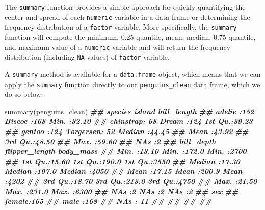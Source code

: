 \documentclass[
]{book}
\newenvironment{Shaded}{\begin{snugshade}}{\end{snugshade}}
\newcommand{\DocumentationTok}[1]{\textcolor[rgb]{0.56,0.35,0.01}{\textbf{\textit{#1}}}}
\newcommand{\FunctionTok}[1]{\textcolor[rgb]{0.00,0.00,0.00}{#1}}
\newcommand{\NormalTok}[1]{#1}
\theoremstyle{definition}
\theoremstyle{definition}
\theoremstyle{definition}
\theoremstyle{definition}
\theoremstyle{remark}
\begin{document}
The \texttt{summary} function provides a simple approach for quickly quantifying the center and spread of each \texttt{numeric} variable in a data frame or determining the frequency distribution of a \texttt{factor} variable. More specifically, the \texttt{summary} function will compute the minimum, 0.25 quantile, mean, median, 0.75 quantile, and maximum value of a \texttt{numeric} variable and will return the frequency distribution (including \texttt{NA} values) of \texttt{factor} variable.

A \texttt{summary} method is available for a \texttt{data.frame} object, which means that we can apply the \texttt{summary} function directly to our \texttt{penguins\_clean} data frame, which we do so below.

\begin{Shaded}
\begin{Highlighting}[]
\FunctionTok{summary}\NormalTok{(penguins\_clean)}
\DocumentationTok{\#\#       species          island     bill\_length   }
\DocumentationTok{\#\#  adelie   :152   Biscoe   :168   Min.   :32.10  }
\DocumentationTok{\#\#  chinstrap: 68   Dream    :124   1st Qu.:39.23  }
\DocumentationTok{\#\#  gentoo   :124   Torgersen: 52   Median :44.45  }
\DocumentationTok{\#\#                                  Mean   :43.92  }
\DocumentationTok{\#\#                                  3rd Qu.:48.50  }
\DocumentationTok{\#\#                                  Max.   :59.60  }
\DocumentationTok{\#\#                                  NA\textquotesingle{}s   :2      }
\DocumentationTok{\#\#    bill\_depth    flipper\_length    body\_mass   }
\DocumentationTok{\#\#  Min.   :13.10   Min.   :172.0   Min.   :2700  }
\DocumentationTok{\#\#  1st Qu.:15.60   1st Qu.:190.0   1st Qu.:3550  }
\DocumentationTok{\#\#  Median :17.30   Median :197.0   Median :4050  }
\DocumentationTok{\#\#  Mean   :17.15   Mean   :200.9   Mean   :4202  }
\DocumentationTok{\#\#  3rd Qu.:18.70   3rd Qu.:213.0   3rd Qu.:4750  }
\DocumentationTok{\#\#  Max.   :21.50   Max.   :231.0   Max.   :6300  }
\DocumentationTok{\#\#  NA\textquotesingle{}s   :2       NA\textquotesingle{}s   :2       NA\textquotesingle{}s   :2     }
\DocumentationTok{\#\#      sex     }
\DocumentationTok{\#\#  female:165  }
\DocumentationTok{\#\#  male  :168  }
\DocumentationTok{\#\#  NA\textquotesingle{}s  : 11  }
\DocumentationTok{\#\#              }
\DocumentationTok{\#\#              }
\DocumentationTok{\#\#              }
\DocumentationTok{\#\# }
\end{Highlighting}
\end{Shaded}
\end{document}
